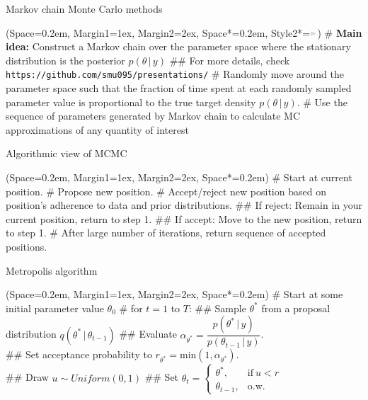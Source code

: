 \documentclass[12pt, aspectratio=149]{beamer}
\newcommand{\listSpace}{0.2em}
\theoremstyle{plain}
\begin{document}
\begin{frame}[fragile]{Markov chain Monte Carlo methods}
	\begin{easylist}
		\ListProperties(Space=\listSpace, Margin1=1ex, Margin2=2ex, Space*=\listSpace, Style2*=$\color{bggraydark}\blacktriangleright$\space)
		# \textbf{Main idea:} Construct a Markov chain over the parameter space where the stationary distribution is the posterior $p(\theta \,\vert\, y)$
		## For more details, check \footnotesize\texttt{https://github.com/smu095/presentations/}
		# Randomly move around the parameter space such that the fraction of time spent at each randomly sampled parameter value is proportional to the true target density $p(\theta \,\vert\,y)$.
		# Use the sequence of parameters generated by Markov chain to calculate MC approximations of any quantity of interest
	\end{easylist}
\end{frame}

\begin{frame}[fragile]{Algorithmic view of MCMC}
	\begin{easylist}[enumerate]
		\ListProperties(Space=\listSpace, Margin1=1ex, Margin2=2ex, Space*=\listSpace)
		# Start at current position.
		# Propose new position.
		# Accept/reject new position based on position's adherence to data and prior distributions.
		## If reject: Remain in your current position, return to step 1.
		## If accept: Move to the new position, return to step 1.
		# After large number of iterations, return sequence of accepted positions.
	\end{easylist}
\end{frame}

\begin{frame}[fragile]{Metropolis algorithm}
	\begin{easylist}[enumerate]
		\ListProperties(Space=\listSpace, Margin1=1ex, Margin2=2ex, Space*=\listSpace)
		# Start at some initial parameter value $\theta_0$
		# for $t=1$ to $T$:
		## Sample $\theta^*$ from a proposal distribution $q(\theta^* \, \vert \, \theta_{t-1})$
		## Evaluate $\alpha_{\theta^*}= \dfrac{p(\theta^* \, \vert \, y)}{p(\theta_{t-1} \, \vert \, y)}$.\\
		## Set acceptance probability to $r_{\theta^*}= \text{min}(1, \alpha_{\theta^*})$.\\
		## Draw $u \sim Uniform(0, 1)$
		## Set $\theta_t = \begin{cases}\theta^*, &\text{if}\ u < r \\ \theta_{t-1}, &\text{o.w.}\ \end{cases}$
	\end{easylist}
\end{frame}
\end{document}
